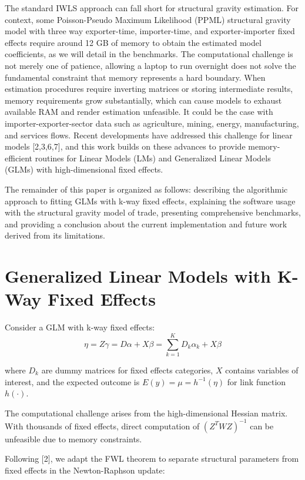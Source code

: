 \documentclass[
  10pt,
  letterpaper,
]{article}
\begin{document}
The standard IWLS approach can fall short for structural gravity
estimation. For context, some Poisson-Pseudo Maximum Likelihood (PPML)
structural gravity model with three way exporter-time, importer-time,
and exporter-importer fixed effects require around 12 GB of memory to
obtain the estimated model coefficients, as we will detail in the
benchmarks. The computational challenge is not merely one of patience,
allowing a laptop to run overnight does not solve the fundamental
constraint that memory represents a hard boundary. When estimation
procedures require inverting matrices or storing intermediate results,
memory requirements grow substantially, which can cause models to
exhaust available RAM and render estimation unfeasible. It could be the
case with importer-exporter-sector data such as agriculture, mining,
energy, manufacturing, and services flows. Recent developments have
addressed this challenge for linear models {[}2,3,6,7{]}, and this work
builds on these advances to provide memory-efficient routines for Linear
Models (LMs) and Generalized Linear Models (GLMs) with high-dimensional
fixed effects.

The remainder of this paper is organized as follows: describing the
algorithmic approach to fitting GLMs with k-way fixed effects,
explaining the software usage with the structural gravity model of
trade, presenting comprehensive benchmarks, and providing a conclusion
about the current implementation and future work derived from its
limitations.

\section{Generalized Linear Models with K-Way Fixed
Effects}\label{generalized-linear-models-with-k-way-fixed-effects}

Consider a GLM with k-way fixed effects:
\[\eta = Z\gamma = D\alpha + X\beta = \sum_{k=1}^{K} D_k\alpha_k + X\beta\]

where \(D_k\) are dummy matrices for fixed effects categories, \(X\)
contains variables of interest, and the expected outcome is
\(E(y) = \mu = h^{-1}(\eta)\) for link function \(h(\cdot)\).

The computational challenge arises from the high-dimensional Hessian
matrix. With thousands of fixed effects, direct computation of
\((Z^{T}WZ)^{-1}\) can be unfeasible due to memory constraints.

Following {[}2{]}, we adapt the FWL theorem to separate structural
parameters from fixed effects in the Newton-Raphson update:
\end{document}
